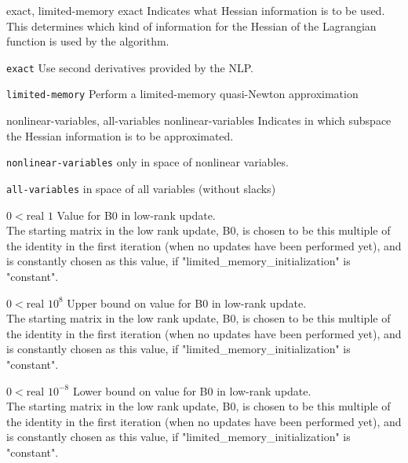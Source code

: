 %
{exact, limited-memory}%
{exact}%
{Indicates what Hessian information is to be used.\\
This determines which kind of information for the Hessian of the Lagrangian function is used by the algorithm.}%
{\begin{list}{}{
\setlength{\parsep}{0em}
\setlength{\leftmargin}{5ex}
\setlength{\labelwidth}{2ex}
\setlength{\itemindent}{0ex}
\setlength{\topsep}{0pt}}
\item[\texttt{exact}] Use second derivatives provided by the NLP.
\item[\texttt{limited-memory}] Perform a limited-memory quasi-Newton approximation
\end{list}
}

%
{nonlinear-variables, all-variables}%
{nonlinear-variables}%
{Indicates in which subspace the Hessian information is to be approximated.}%
{\begin{list}{}{
\setlength{\parsep}{0em}
\setlength{\leftmargin}{5ex}
\setlength{\labelwidth}{2ex}
\setlength{\itemindent}{0ex}
\setlength{\topsep}{0pt}}
\item[\texttt{nonlinear-variables}] only in space of nonlinear variables.
\item[\texttt{all-variables}] in space of all variables (without slacks)
\end{list}
}

%
{$0<\textrm{real}$}%
{$1$}%
{Value for B0 in low-rank update.\\
The starting matrix in the low rank update, B0, is chosen to be this multiple of the identity in the first iteration (when no updates have been performed yet), and is constantly chosen as this value, if "limited\_memory\_initialization" is "constant".}%
{}

%
{$0<\textrm{real}$}%
{$10^{  8}$}%
{Upper bound on value for B0 in low-rank update.\\
The starting matrix in the low rank update, B0, is chosen to be this multiple of the identity in the first iteration (when no updates have been performed yet), and is constantly chosen as this value, if "limited\_memory\_initialization" is "constant".}%
{}

%
{$0<\textrm{real}$}%
{$10^{- 8}$}%
{Lower bound on value for B0 in low-rank update.\\
The starting matrix in the low rank update, B0, is chosen to be this multiple of the identity in the first iteration (when no updates have been performed yet), and is constantly chosen as this value, if "limited\_memory\_initialization" is "constant".}%
{}

